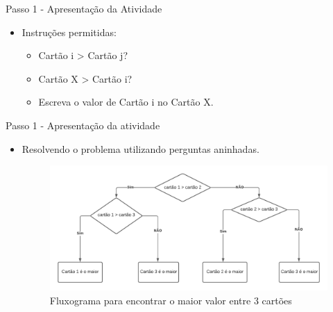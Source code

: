 \documentclass{beamer}
\begin{document}
\begin{frame}{Passo 1 - Apresentação da Atividade}

\begin{itemize}
   
\item <1-> Instruções permitidas:

    \begin{itemize}
        \item Cartão i > Cartão j?
        \item Cartão X > Cartão i?
        \item Escreva o valor de Cartão i no Cartão X.
    \end{itemize}

 
\end{itemize}

\end{frame}



\begin{frame}{Passo 1 - Apresentação da atividade}


\begin{itemize}
    \item Resolvendo o problema utilizando perguntas aninhadas.
    
\begin{figure}
\begin{center}
	\includegraphics[scale=0.5]{images/fluxograma2.png} 
\end{center}
\caption{Fluxograma para encontrar o maior valor entre 3 cartões}
\end{figure}

 
    

\end{itemize}


\end{frame}


\end{document}
